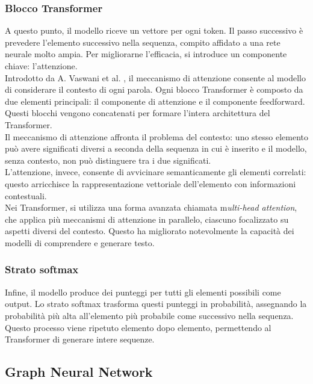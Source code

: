 \documentclass[12pt,a4paper,openright,twoside]{report}
\begin{document}
\subsubsection{Blocco Transformer}
A questo punto, il modello riceve un vettore per ogni token. Il passo successivo è prevedere l'elemento successivo nella sequenza, compito affidato a una rete neurale molto ampia. Per migliorarne l’efficacia, si introduce un componente chiave: l’attenzione.\\
Introdotto da A. Vaswani et al. \cite{Transformer}, il meccanismo di attenzione consente al modello di considerare il contesto di ogni parola. Ogni blocco Transformer è composto da due elementi principali:
il componente di attenzione e il componente feedforward. Questi blocchi vengono concatenati per formare l’intera architettura del Transformer.\\
Il meccanismo di attenzione affronta il problema del contesto: uno stesso elemento può avere significati diversi a seconda della sequenza in cui è inserito e il modello, senza contesto, non può distinguere tra i due significati.\\
L’attenzione, invece, consente di avvicinare semanticamente gli elementi correlati: questo arricchisce la rappresentazione vettoriale dell'elemento con informazioni contestuali.\\
Nei Transformer, si utilizza una forma avanzata chiamata m\textit{ulti-head attention}, che applica più meccanismi di attenzione in parallelo, ciascuno focalizzato su aspetti diversi del contesto. Questo ha migliorato notevolmente la capacità dei modelli di comprendere e generare testo.

\subsubsection{Strato softmax}
Infine, il modello produce dei punteggi per tutti gli elementi possibili come output. Lo strato softmax trasforma questi punteggi in probabilità, assegnando la probabilità più alta all'elemento più probabile come successivo nella sequenza. Questo processo viene ripetuto elemento dopo elemento, permettendo al Transformer di generare intere sequenze.


\subsection{Graph Neural Network}
\end{document}
